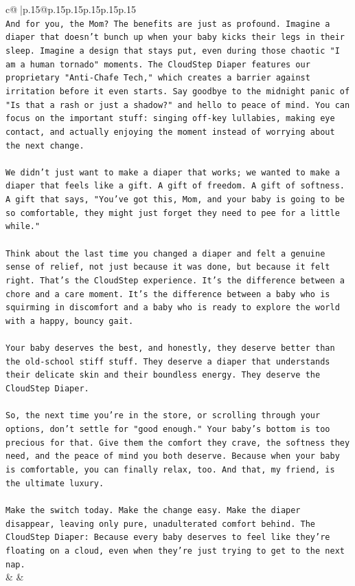 \documentclass{article}
\begin{document}
{\begin{supertabular}{c@{$\;$}|p{.15\linewidth}@{}p{.15\linewidth}p{.15\linewidth}p{.15\linewidth}p{.15\linewidth}p{.15\linewidth}}
{{{\\ 
\texttt{And for you, the Mom? The benefits are just as profound. Imagine a diaper that doesn't bunch up when your baby kicks their legs in their sleep. Imagine a design that stays put, even during those chaotic "I am a human tornado" moments. The CloudStep Diaper features our proprietary "Anti{-}Chafe Tech," which creates a barrier against irritation before it even starts. Say goodbye to the midnight panic of "Is that a rash or just a shadow?" and hello to peace of mind. You can focus on the important stuff: singing off{-}key lullabies, making eye contact, and actually enjoying the moment instead of worrying about the next change.} \\
\\ 
\texttt{We didn't just want to make a diaper that works; we wanted to make a diaper that feels like a gift. A gift of freedom. A gift of softness. A gift that says, "You've got this, Mom, and your baby is going to be so comfortable, they might just forget they need to pee for a little while."} \\
\\ 
\texttt{Think about the last time you changed a diaper and felt a genuine sense of relief, not just because it was done, but because it felt right. That's the CloudStep experience. It's the difference between a chore and a care moment. It's the difference between a baby who is squirming in discomfort and a baby who is ready to explore the world with a happy, bouncy gait.} \\
\\ 
\texttt{Your baby deserves the best, and honestly, they deserve better than the old{-}school stiff stuff. They deserve a diaper that understands their delicate skin and their boundless energy. They deserve the CloudStep Diaper.} \\
\\ 
\texttt{So, the next time you're in the store, or scrolling through your options, don't settle for "good enough." Your baby's bottom is too precious for that. Give them the comfort they crave, the softness they need, and the peace of mind you both deserve. Because when your baby is comfortable, you can finally relax, too. And that, my friend, is the ultimate luxury.} \\
\\ 
\texttt{Make the switch today. Make the change easy. Make the diaper disappear, leaving only pure, unadulterated comfort behind. The CloudStep Diaper: Because every baby deserves to feel like they're floating on a cloud, even when they're just trying to get to the next nap.} \\
            }
        }
    }
    & & \\ \\


\end{supertabular}}
\end{document}
